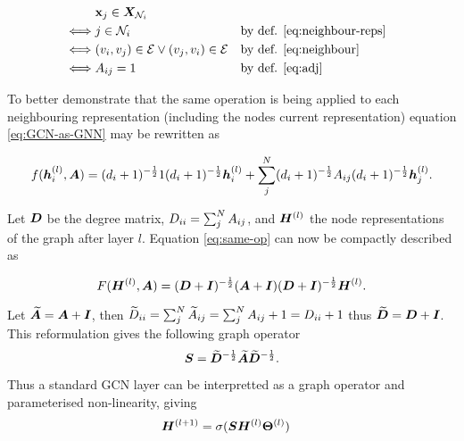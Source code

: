 \begin{align*}
    &{\textbf{x}}_j \in {\bm{X}}_{{\mathcal{N}}_i} \\
    \iff &j \in {\mathcal{N}}_i &&\text{by def. \ref{eq:neighbour-reps}} \\
    \iff &(v_i, v_j) \in {\mathcal{E}} \vee (v_j, v_i) \in {\mathcal{E}} &&\text{by def. \ref{eq:neighbour}} \\
    \iff &A_{ij} = 1 &&\text{by def. \ref{eq:adj}}
\end{align*}

To better demonstrate that the same operation is being applied to each neighbouring representation (including the nodes current representation) equation \ref{eq:GCN-as-GNN} may be rewritten as

\begin{equation}
    \label{eq:same-op}
    f({\bm{h}}_i^{(l)}, {\bm{A}}) = (d_i + 1)^{-\frac12}1(d_i + 1)^{-\frac12}{\bm{h}}_i^{(l)} + \sum_j^N(d_i + 1)^{-\frac12}{A}_{ij}(d_i + 1)^{-\frac12}{\bm{h}}_j^{(l)}.
\end{equation}

Let ${\bm{D}}$ be the degree matrix, ${D}_{ii} = \sum_j^N {A}_{ij}$, and ${\bm{H}}^{(l)}$ the node representations of the graph after layer $l$. Equation \ref{eq:same-op} can now be compactly described as 

\begin{equation}
    F({\bm{H}}^{(l)}, {\bm{A}}) = ({\bm{D}} + {\bm{I}})^{-\frac12}({\bm{A}} + {\bm{I}})({\bm{D}} + {\bm{I}})^{-\frac12}{\bm{H}}^{(l)}.
\end{equation}

Let $\widetilde{{\bm{A}}} = {\bm{A}} + {\bm{I}}$, then $\widetilde{{D}}_{ii} = \sum_j^N \widetilde{{A}}_{ij} = \sum_j^N {A}_{ij} + 1 = {D}_{ii} + 1$ thus $\widetilde{{\bm{D}}} = {\bm{D}} + {\bm{I}}$.
This reformulation gives the following graph operator 
\begin{equation}
    \label{eq:op}
    {\bm{S}} = \widetilde{{\bm{D}}}^{-\frac12}\widetilde{{\bm{A}}}\widetilde{{\bm{D}}}^{-\frac12}.
\end{equation}

Thus a standard GCN layer can be interpretted as a graph operator and parameterised non-linearity, giving
\begin{align}
    \label{eq:GCN1}
    {\bm{H}}^{(l+1)} & = \sigma({\bm{S}}{\bm{H}}^{(l)}\bm{\Theta}^{(l)})
\end{align}


